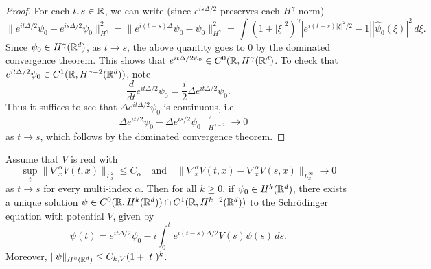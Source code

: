 \begin{proof}
  For each $t, s \in \mathbb{R}$, we can write (since
  $e^{is\Delta / 2}$ preserves each $H^\gamma$ norm)
  \[
    \|e^{it\Delta / 2} \psi_0 - e^{is\Delta / 2} \psi_0\|_{H^\gamma}^2
    = \|e^{i(t - s)\Delta} \psi_0 - \psi_0\|_{H^\gamma}^2
    = \int (1 + |\xi|^2)^{\gamma} |e^{i(t - s)|\xi|^2 / 2} - 1| |\widehat{\psi}_0(\xi)|^2\, d\xi.
  \]
  Since $\psi_0 \in H^\gamma(\mathbb{R}^d)$,
  as $t \to s$, the above quantity goes to $0$
  by the dominated convergence theorem. This shows that
  $e^{it\Delta / 2 \psi_0} \in C^0(\mathbb{R}, H^\gamma(\mathbb{R}^d)$.
  To check that $e^{it\Delta / 2} \psi_0 \in C^1(\mathbb{R}, H^{\gamma - 2}(\mathbb{R}^d))$, note
  \[
    \frac{d}{dt} e^{it\Delta / 2} \psi_0
    = \frac{i}{2} \Delta e^{it\Delta / 2} \psi_0.
  \]
  Thus it suffices to see that $\Delta e^{it\Delta / 2} \psi_0$ is continuous, i.e.
  \[
    \|\Delta e^{it / 2} \psi_0 - \Delta e^{is / 2} \psi_0\|_{H^{\gamma - 2}}^2 \to 0
  \]
  as $t \to s$, which follows by the dominated
  convergence theorem.
\end{proof}

\begin{theorem}
  Assume that $V$ is real with
  \[
    \sup_{t} \|\nabla_x^\alpha V(t, x) \|_{L^2_x} \le C_\alpha
    \quad \text{and} \quad
    \|\nabla_x^\alpha V(t, x) - \nabla_x^\alpha V(s, x)\|_{L^\infty_x} \to 0
  \]
  as $t \to s$ for every multi-index $\alpha$.
  Then for all $k \ge 0$, if $\psi_0 \in H^k(\mathbb{R}^d)$,
  there exists a unique solution
  $\psi \in C^0(\mathbb{R}, H^k(\mathbb{R}^d)) \cap C^1(\mathbb{R}, H^{k - 2}(\mathbb{R}^d))$
  to the Schr\"odinger equation with potential $V$,
  given by
  \[
    \psi(t) = e^{it\Delta / 2} \psi_0 - i \int_0^t e^{i(t - s)\Delta / 2} V(s) \psi(s)\, ds.
  \]
  Moreover, $\|\psi\|_{H^k(\mathbb{R}^d)} \le C_{k, V} (1 + |t|)^k$.
\end{theorem}

